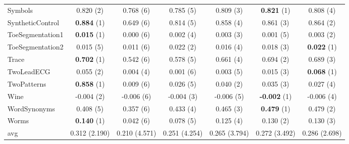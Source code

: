 \begin{table}[ht]
\begin{adjustbox}{width=\textwidth}
\begin{tabular}{lcccccc}
    Symbols & 0.820 (2) & 0.768 (6) & 0.785 (5) & 0.809 (3) & \textbf{0.821} (1) & 0.808 (4) \\
    SyntheticControl & \textbf{0.884} (1) & 0.649 (6) & 0.814 (5) & 0.858 (4) & 0.861 (3) & 0.864 (2) \\
    ToeSegmentation1 & \textbf{0.015} (1) & 0.000 (6) & 0.002 (4) & 0.003 (3) & 0.001 (5) & 0.003 (2) \\
    ToeSegmentation2 & 0.015 (5) & 0.011 (6) & 0.022 (2) & 0.016 (4) & 0.018 (3) & \textbf{0.022} (1) \\
    Trace & \textbf{0.702} (1) & 0.542 (6) & 0.578 (5) & 0.661 (4) & 0.694 (2) & 0.689 (3) \\
    TwoLeadECG & 0.055 (2) & 0.004 (4) & 0.001 (6) & 0.003 (5) & 0.015 (3) & \textbf{0.068} (1) \\
    TwoPatterns & \textbf{0.858} (1) & 0.009 (6) & 0.026 (5) & 0.040 (2) & 0.035 (3) & 0.027 (4) \\
    Wine & -0.004 (2) & -0.006 (6) & -0.004 (3) & -0.006 (5) & \textbf{-0.002} (1) & -0.006 (4) \\
    WordSynonyms & 0.408 (5) & 0.357 (6) & 0.433 (4) & 0.465 (3) & \textbf{0.479} (1) & 0.479 (2) \\
    Worms & \textbf{0.140} (1) & 0.042 (6) & 0.078 (5) & 0.125 (4) & 0.130 (2) & 0.130 (3) \\
    \hline 
    avg & 0.312 (2.190) & 0.210 (4.571) & 0.251 (4.254) & 0.265 (3.794) & 0.272 (3.492) & 0.286 (2.698) \\ 
    \hline
    \end{tabular}
    \end{adjustbox}
    \end{table}
    
    
    
